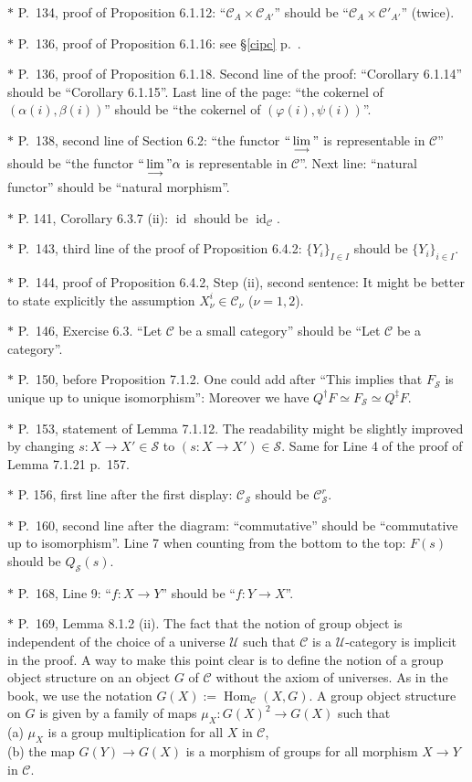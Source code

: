 \documentclass[12pt]{article}
\theoremstyle{remark}
\theoremstyle{definition}
\newcommand{\cc}{\mathcal}
\newcommand{\C}{\mathcal C}
\newcommand{\SSS}{\mathcal S}
\newcommand{\U}{\mathcal U}
\DeclareMathOperator{\id}{id}
\DeclareMathOperator{\Hom}{Hom}%
\begin{document}
\noindent $*$ P.~134, proof of Proposition 6.1.12: ``$\C_A\times\C_{A'}$'' should be ``$\C_A\times\C'_{A'}$'' (twice).

\noindent $*$ P.~136, proof of Proposition 6.1.16: see \S\ref{cipc} p.~\pageref{cipc}.

\noindent $*$ P.~136, proof of Proposition 6.1.18. Second line of the proof: ``Corollary 6.1.14'' should be ``Corollary 6.1.15''. Last line of the page: ``the cokernel of $(\alpha(i),\beta(i))$'' should be ``the cokernel of $(\varphi(i),\psi(i))$''.

\noindent $*$ P.~138, second line of Section 6.2: ``the functor $``\displaystyle\lim_{\longrightarrow}"$ is representable in $\C$'' should be ``the functor $``\displaystyle\lim_{\longrightarrow}"\alpha$ is representable in $\C$''. Next line: ``natural functor'' should be ``natural morphism''.

\noindent $*$ P. 141, Corollary 6.3.7 (ii): $\id$ should be $\id_\C$.

\noindent $*$ P.~143, third line of the proof of Proposition 6.4.2: $\{Y_i\}_{I\in I}$ should be $\{Y_i\}_{i\in I}$.

\noindent $*$ P.~144, proof of Proposition 6.4.2, Step (ii), second sentence: It might be better to state explicitly the assumption $X_\nu^i\in\C_\nu$ ($\nu=1,2$). 

\noindent $*$ P.~146, Exercise 6.3. ``Let $\C$ be a small category'' should be ``Let $\C$ be a category''.

\noindent $*$ P.~150, before Proposition 7.1.2. One could add after ``This implies that $F_{\SSS}$ is unique up to unique isomorphism'': Moreover we have $Q^\dagger F\simeq F_{\SSS}\simeq Q^\ddagger F$.

\noindent $*$ P.~153, statement of Lemma 7.1.12. The readability might be slightly improved by changing $s:X\to X'\in\mathcal S$ to $(s:X\to X')\in\mathcal S$. Same for Line 4 of the proof of Lemma 7.1.21 p.~157.

\noindent $*$ P. 156, first line after the first display: $\C_{\cc S}$ should be $\C_{\cc S}^r$.

\noindent $*$ P.~160, second line after the diagram: ``commutative'' should be ``commutative up to isomorphism''. Line 7 when counting from the bottom to the top: $F(s)$ should be $Q_{\mathcal S}(s)$.

\noindent $*$ P.~168, Line 9: ``$f:X\to Y$'' should be ``$f:Y\to X$''.

\noindent $*$ P.~169, Lemma 8.1.2 (ii). The fact that the notion of group object is independent of the choice of a universe $\U$ such that $\C$ is a $\U$-category is implicit in the proof. A way to make this point clear is to define the notion of a group object structure on an object $G$ of $\C$ without the axiom of universes. As in the book, we use the notation $G(X):=\Hom_\C(X,G)$. A group object structure on $G$ is given by a family of maps $\mu_X:G(X)^2\to G(X)$ such that\\ 
\noindent(a) $\mu_X$ is a group multiplication for all $X$ in $\C$,\\ 
\noindent(b) the map $G(Y)\to G(X)$ is a morphism of groups for all morphism $X\to Y$ in $\C$.
\end{document}
